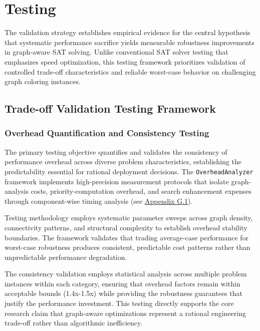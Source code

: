 \section{Testing}
\label{sec:testing}

The validation strategy establishes empirical evidence for the central hypothesis that systematic performance sacrifice yields measurable robustness improvements in graph-aware SAT solving. Unlike conventional SAT solver testing that emphasizes speed optimization, this testing framework prioritizes validation of controlled trade-off characteristics and reliable worst-case behavior on challenging graph coloring instances.

\subsection{Trade-off Validation Testing Framework}
\label{sec:tradeoff-validation-framework}

\subsubsection{Overhead Quantification and Consistency Testing}
\label{sec:overhead-quantification}

The primary testing objective quantifies and validates the consistency of performance overhead across diverse problem characteristics, establishing the predictability essential for rational deployment decisions. The \texttt{OverheadAnalyzer} framework implements high-precision measurement protocols that isolate graph-analysis costs, priority-computation overhead, and search enhancement expenses through component-wise timing analysis (see \hyperref[appendix:overhead-measurement]{Appendix G.1}).

Testing methodology employs systematic parameter sweeps across graph density, connectivity patterns, and structural complexity to establish overhead stability boundaries. The framework validates that trading average-case performance for worst-case robustness produces consistent, predictable cost patterns rather than unpredictable performance degradation.

The consistency validation employs statistical analysis across multiple problem instances within each category, ensuring that overhead factors remain within acceptable bounds (1.4x-1.5x) while providing the robustness guarantees that justify the performance investment. This testing directly supports the core research claim that graph-aware optimizations represent a rational engineering trade-off rather than algorithmic inefficiency.

